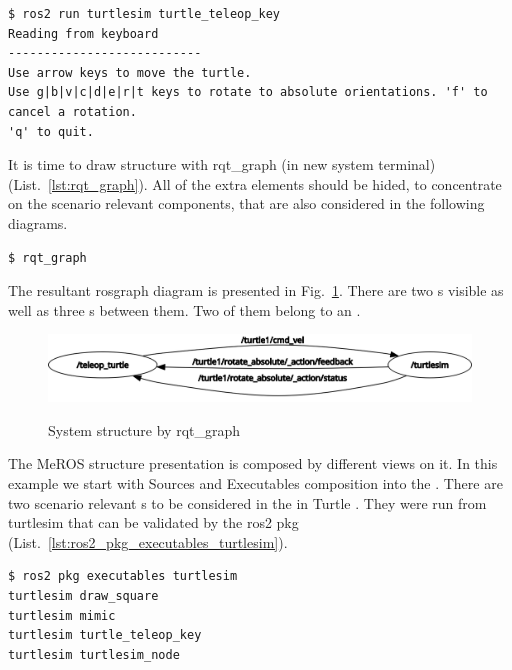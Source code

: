 \documentclass[11pt,oneside,a4paper]{report}
\begin{document}
\begin{lstlisting}[style=terminal,label={lst:ros2_run_turtle_teleop_key},caption={ros2 run turtlesim turtle\_teleop\_key}]
$ ros2 run turtlesim turtle_teleop_key
Reading from keyboard
---------------------------
Use arrow keys to move the turtle.
Use g|b|v|c|d|e|r|t keys to rotate to absolute orientations. 'f' to cancel a rotation.
'q' to quit.
\end{lstlisting}

It is time to draw \stSystem{} structure with \textsf{rqt\_graph} \stCLTool{} (in new system terminal)  (List.~\ref{lst:rqt_graph}). All of the extra elements should be hided, to concentrate on the scenario relevant \stSystem{} components, that are also considered in the following diagrams.

\begin{lstlisting}[style=terminal,label={lst:rqt_graph},caption={rqt\_graph}]
$ rqt_graph
\end{lstlisting}

The resultant rosgraph diagram is presented in Fig.~\ref{fig:rqt_graph}. There are two \stNode{}s visible as well as three \stTopic{}s between them. Two of them belong to an \stAction{}.

\begin{figure}[H]
	\centering
	\begin{center}
		{\includegraphics[scale=.5]{diagrams/rosgraph.png}}
	\end{center}
	\caption{System structure by rqt\_graph}
	\label{fig:rqt_graph}
\end{figure}


The MeROS \stSystem{} structure presentation is composed by different views on it. In this example we start with Sources and Executables composition into the \stSystem{}. There are two scenario relevant \stNode{}s to be considered in the in \textsf{Turtle} \stSystem{}. They were run from \textsf{turtlesim} \stPackage{} that can be validated by the \textsf{ros2 pkg} \stCLTool{} (List.~\ref{lst:ros2_pkg_executables_turtlesim}).

\begin{lstlisting}[style=terminal,label={lst:ros2_pkg_executables_turtlesim},caption={ros2 pkg executables turtlesim}]
$ ros2 pkg executables turtlesim
turtlesim draw_square
turtlesim mimic
turtlesim turtle_teleop_key
turtlesim turtlesim_node
\end{lstlisting}
\end{document}
